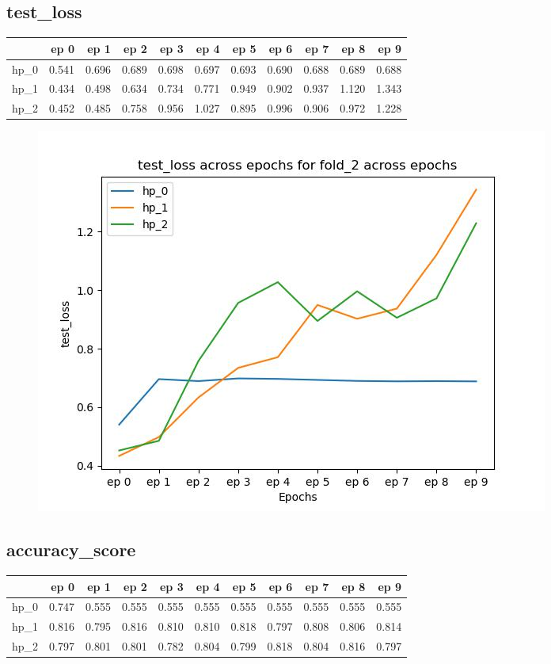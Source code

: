 \documentclass{article}
\begin{document}
\subsection{test\_loss}
\begin{tabular}{lrrrrrrrrrr}
\toprule
{} &   ep 0 &   ep 1 &   ep 2 &   ep 3 &   ep 4 &   ep 5 &   ep 6 &   ep 7 &   ep 8 &   ep 9 \\
\midrule
hp\_0 &  0.541 &  0.696 &  0.689 &  0.698 &  0.697 &  0.693 &  0.690 &  0.688 &  0.689 &  0.688 \\
hp\_1 &  0.434 &  0.498 &  0.634 &  0.734 &  0.771 &  0.949 &  0.902 &  0.937 &  1.120 &  1.343 \\
hp\_2 &  0.452 &  0.485 &  0.758 &  0.956 &  1.027 &  0.895 &  0.996 &  0.906 &  0.972 &  1.228 \\
\bottomrule
\end{tabular}

\begin{figure}[H]
\includegraphics[scale = 0.75]{fold_2/test_loss}
\end{figure}
\subsection{accuracy\_score}
\begin{tabular}{lrrrrrrrrrr}
\toprule
{} &   ep 0 &   ep 1 &   ep 2 &   ep 3 &   ep 4 &   ep 5 &   ep 6 &   ep 7 &   ep 8 &   ep 9 \\
\midrule
hp\_0 &  0.747 &  0.555 &  0.555 &  0.555 &  0.555 &  0.555 &  0.555 &  0.555 &  0.555 &  0.555 \\
hp\_1 &  0.816 &  0.795 &  0.816 &  0.810 &  0.810 &  0.818 &  0.797 &  0.808 &  0.806 &  0.814 \\
hp\_2 &  0.797 &  0.801 &  0.801 &  0.782 &  0.804 &  0.799 &  0.818 &  0.804 &  0.816 &  0.797 \\
\bottomrule
\end{tabular}
\end{document}
